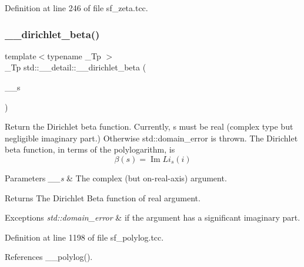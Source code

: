 Definition at line 246 of file sf\+\_\+zeta.\+tcc.

\mbox{\label{namespacestd_1_1____detail_ad0c8e975438d30cbfb5cad91f3ac6d01}} 
\subsubsection{\texorpdfstring{\+\_\+\+\_\+dirichlet\+\_\+beta()}{\_\_dirichlet\_beta()}\hspace{0.1cm}{\footnotesize\ttfamily [1/2]}}
{\footnotesize\ttfamily template$<$typename \+\_\+\+Tp $>$ \\
\+\_\+\+Tp std\+::\+\_\+\+\_\+detail\+::\+\_\+\+\_\+dirichlet\+\_\+beta (\begin{DoxyParamCaption}\item[{std\+::complex$<$ \+\_\+\+Tp $>$}]{\+\_\+\+\_\+s }\end{DoxyParamCaption})}

Return the Dirichlet beta function. Currently, s must be real (complex type but negligible imaginary part.) Otherwise std\+::domain\+\_\+error is thrown. The Dirichlet beta function, in terms of the polylogarithm, is \[ \renewcommand\Re{\operatorname{Re}} \renewcommand\Im{\operatorname{Im}} \beta(s) = \Im{Li_s(i)} \]


\begin{DoxyParams}{Parameters}
{\em \+\_\+\+\_\+s} & The complex (but on-\/real-\/axis) argument. \\
\hline
\end{DoxyParams}
\begin{DoxyReturn}{Returns}
The Dirichlet Beta function of real argument. 
\end{DoxyReturn}

\begin{DoxyExceptions}{Exceptions}
{\em std\+::domain\+\_\+error} & if the argument has a significant imaginary part. \\
\hline
\end{DoxyExceptions}


Definition at line 1198 of file sf\+\_\+polylog.\+tcc.



References \+\_\+\+\_\+polylog().

